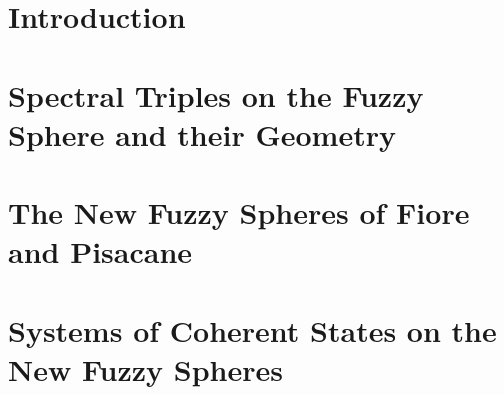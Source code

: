 \documentclass[12pt]{report}
\theoremstyle{definition}
\begin{document}



\setcounter{chapter}{0}
\chapter{Introduction}\label{chp:intro}


\chapter{Spectral Triples on the Fuzzy Sphere and their Geometry}\label{chp:fuzzysphere}


\chapter{The New Fuzzy Spheres of Fiore and Pisacane}\label{chp:NewFuzzy}


\chapter{Systems of Coherent States on the New Fuzzy Spheres}\label{chp:CHNew}

\end{document}
